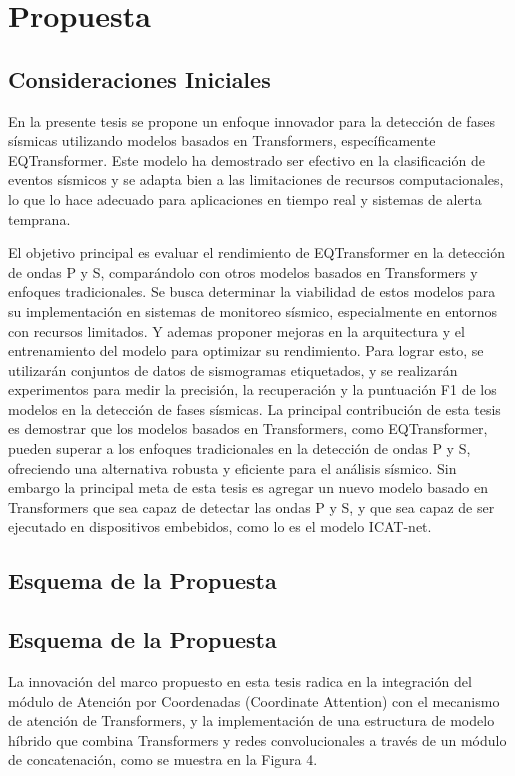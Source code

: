 \chapter{Propuesta}

\section{Consideraciones Iniciales}
En la presente tesis se propone un enfoque innovador para la detección de fases sísmicas utilizando modelos basados en Transformers, específicamente EQTransformer. Este modelo ha demostrado ser efectivo en la clasificación de eventos sísmicos y se adapta bien a las limitaciones de recursos computacionales, lo que lo hace adecuado para aplicaciones en tiempo real y sistemas de alerta temprana.

El objetivo principal es evaluar el rendimiento de EQTransformer en la detección de ondas P y S, comparándolo con otros modelos basados en Transformers y enfoques tradicionales. Se busca determinar la viabilidad de estos modelos para su implementación en sistemas de monitoreo sísmico, especialmente en entornos con recursos limitados. Y ademas proponer mejoras en la arquitectura y el entrenamiento del modelo para optimizar su rendimiento. Para lograr esto, se utilizarán conjuntos de datos de sismogramas etiquetados, y se realizarán experimentos para medir la precisión, la recuperación y la puntuación F1 de los modelos en la detección de fases sísmicas. La principal contribución de esta tesis es demostrar que los modelos basados en Transformers, como EQTransformer, pueden superar a los enfoques tradicionales en la detección de ondas P y S, ofreciendo una alternativa robusta y eficiente para el análisis sísmico. Sin embargo la principal meta de esta tesis es agregar un nuevo modelo basado en Transformers que sea capaz de detectar las ondas P y S, y que sea capaz de ser ejecutado en dispositivos embebidos, como lo es el modelo ICAT-net.

\section{Esquema de la Propuesta}

\section{Esquema de la Propuesta}

La innovación del marco propuesto en esta tesis radica en la integración del módulo de Atención por Coordenadas (Coordinate Attention) con el mecanismo de atención de Transformers, y la implementación de una estructura de modelo híbrido que combina Transformers y redes convolucionales a través de un módulo de concatenación, como se muestra en la Figura 4. 

